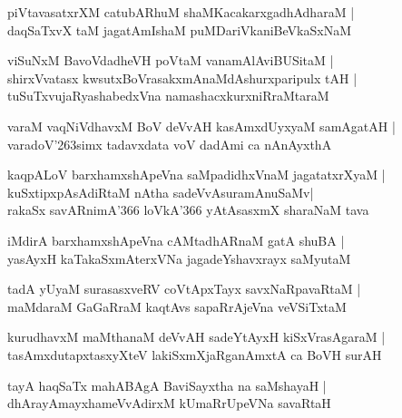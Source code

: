 \begin{shloka}
piVtavasatxrXM catubARhuM shaMKacakarxgadhAdharaM |\\
daqSaTxvX taM jagatAmIshaM puMDariVkaniBeVkaSxNaM
\end{shloka}

\begin{shloka}
viSuNxM BavoVdadheVH poVtaM vanamAlAviBUSitaM |\\
shirxVvatasx kwsutxBoVrasakxmAnaMdAshurxparipulx tAH |\\
tuSuTxvujaRyashabedxVna namashacxkurxniRraMtaraM
\end{shloka}

\begin{shloka}
varaM vaqNiVdhavxM BoV deVvAH kasAmxdUyxyaM samAgatAH |\\
varadoV\char'263simx tadavxdata voV dadAmi ca nAnAyxthA
\end{shloka}

\begin{shloka}
kaqpALoV barxhamxshApeVna saMpadidhxVnaM jagatatxrXyaM |\\
kuSxtipxpAsAdiRtaM nAtha sadeVvAsuramAnuSaMv|\\
rakaSx savARnimA\char'366 loVkA\char'366 yAtAsasxmX sharaNaM tava
\end{shloka}

\begin{shloka}
iMdirA barxhamxshApeVna cAMtadhARnaM gatA shuBA |\\
yasAyxH kaTakaSxmAterxVNa jagadeYshavxrayx saMyutaM 
\end{shloka}

\begin{shloka}
tadA yUyaM surasasxveRV coVtApxTayx savxNaRpavaRtaM |\\
maMdaraM GaGaRraM kaqtAvs sapaRrAjeVna veVSiTxtaM
\end{shloka}

\begin{shloka}
kurudhavxM maMthanaM deVvAH sadeYtAyxH kiSxVrasAgaraM |\\
tasAmxdutapxtasxyXteV lakiSxmXjaRganAmxtA ca BoVH surAH
\end{shloka}

\begin{shloka}
tayA haqSaTx mahABAgA BaviSayxtha na saMshayaH |\\
dhArayAmayxhameVvAdirxM kUmaRrUpeVNa savaRtaH 
\end{shloka}

